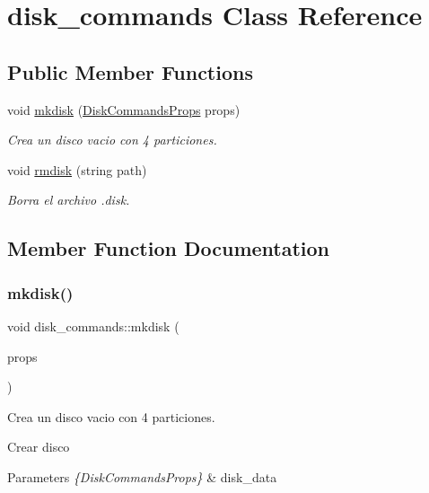 \hypertarget{classdisk__commands}{}\section{disk\+\_\+commands Class Reference}
\label{classdisk__commands}
\subsection*{Public Member Functions}
\begin{DoxyCompactItemize}
\item 
void \hyperlink{classdisk__commands_a5a447276c75f649b6fef291ac05c053f}{mkdisk} (\hyperlink{structDiskCommandsProps}{Disk\+Commands\+Props} props)
\begin{DoxyCompactList}\small\item\em Crea un disco vacio con 4 particiones. \end{DoxyCompactList}\item 
void \hyperlink{classdisk__commands_aaa2145946615ccf353aea1380a6a8e7e}{rmdisk} (string path)
\begin{DoxyCompactList}\small\item\em Borra el archivo .disk. \end{DoxyCompactList}\end{DoxyCompactItemize}


\subsection{Member Function Documentation}
\mbox{\label{classdisk__commands_a5a447276c75f649b6fef291ac05c053f}} 
\subsubsection{\texorpdfstring{mkdisk()}{mkdisk()}}
{\footnotesize\ttfamily void disk\+\_\+commands\+::mkdisk (\begin{DoxyParamCaption}\item[{\hyperlink{structDiskCommandsProps}{Disk\+Commands\+Props}}]{props }\end{DoxyParamCaption})}



Crea un disco vacio con 4 particiones. 

Crear disco 
\begin{DoxyParams}{Parameters}
{\em \{\+Disk\+Commands\+Props\}} & disk\+\_\+data \\
\hline
\end{DoxyParams}
\mbox{\label{classdisk__commands_aaa2145946615ccf353aea1380a6a8e7e}} 
